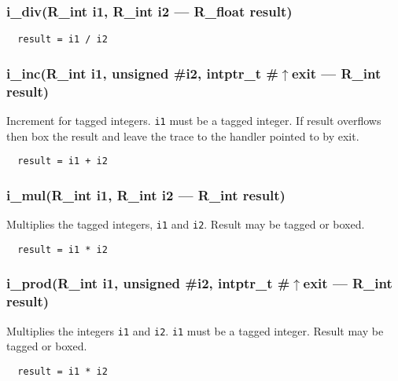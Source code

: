 \subsubsection{i\_div(R\_int i1, R\_int i2 --- R\_float result)}
\vspace{-1em}\begin{verbatim}
  result = i1 / i2
\end{verbatim}
\vspace{-1em}\vspace{-1em}
\subsubsection{i\_inc(R\_int i1, unsigned \#i2, intptr\_t \#$\uparrow$exit --- R\_int result)}
\vspace{-1em}Increment for tagged integers. \texttt{i1} must be a tagged integer. If result overflows then box the result and leave the trace to the handler pointed to by exit. \vspace{-1em}\begin{verbatim}
  result = i1 + i2
\end{verbatim}
\vspace{-1em}\vspace{-1em}
\subsubsection{i\_mul(R\_int i1, R\_int i2 --- R\_int result)}
\vspace{-1em}Multiplies the tagged integers, \texttt{i1} and \texttt{i2}. Result may be tagged or boxed. \vspace{-1em}\begin{verbatim}
  result = i1 * i2
\end{verbatim}
\vspace{-1em}\vspace{-1em}
\subsubsection{i\_prod(R\_int i1, unsigned \#i2, intptr\_t \#$\uparrow$exit --- R\_int result)}
\vspace{-1em}Multiplies the integers \texttt{i1} and \texttt{i2}. \texttt{i1} must be a tagged integer. Result may be tagged or boxed. \vspace{-1em}\begin{verbatim}
  result = i1 * i2
\end{verbatim}
\vspace{-1em}\vspace{-1em}
